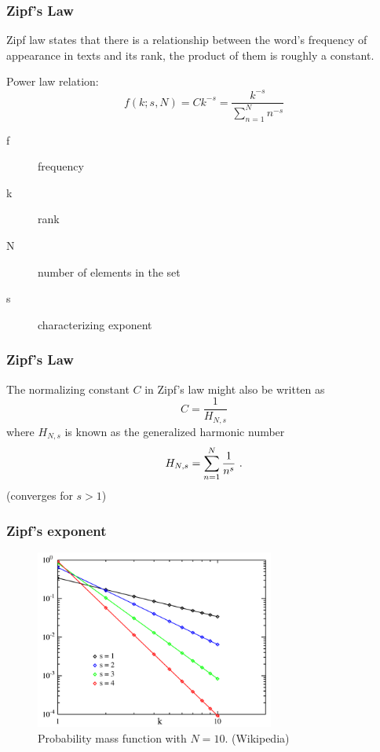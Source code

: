 \documentclass[notes]{beamer}
\begin{document}
\frame
{
  \frametitle{Zipf's Law}

 Zipf law states that there is a relationship between the word's frequency of appearance in texts and its rank, the product of them is roughly a constant.
 
 Power law relation: 
 \begin{equation}
 f(k;s,N) = Ck^{-s} = \frac{k^{-s}}{\sum_{n=1}^{N} n^{-s}}
 \end{equation}

 \begin{description}
 \item[f] frequency
 \item[k] rank
 \item[N] number of elements in the set
 \item[s] characterizing exponent
 \end{description}

}


\frame
{
  \frametitle{Zipf's Law}
  The normalizing constant $C$ in Zipf's law might also be written as
  \begin{equation}
  C = \frac{1}{H_{N,s}} 
  \end{equation}
  where $H_{N,s}$ is known as the generalized harmonic number
  \begin{equation}
  H_{N,s} = \sum_{n=1}^{N} \frac{1}{n^s} \textmd{ .}
  \end{equation}
  (converges for $s>1$)
}



\frame
{
  \frametitle{Zipf's exponent}

  \begin{figure}[h!]
  \centering
  \includegraphics[width=0.7\textwidth]{images/zipfdistribution.png}
  \caption{Probability mass function with $N=10$. (Wikipedia)}
  \end{figure}
}
\end{document}
